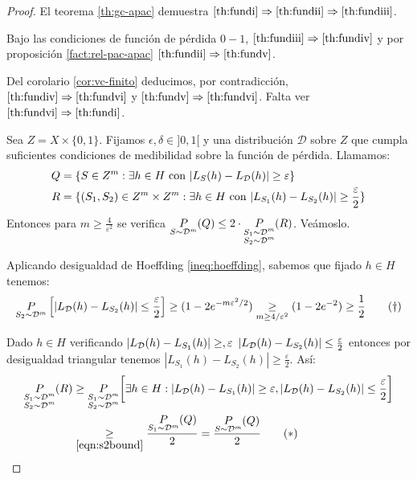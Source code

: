 \begin{proof}
 El teorema \ref{th:gc-apac} demuestra $\eqref{th:fundi} \Rightarrow \eqref{th:fundii} \Rightarrow \eqref{th:fundiii}$.
 
 Bajo las condiciones de función de pérdida $0-1$, $\eqref{th:fundiii} \Rightarrow \eqref{th:fundiv}$ y 
 por proposición \ref{fact:rel-pac-apac} $\eqref{th:fundii} \Rightarrow \eqref{th:fundv}$.
 
 Del corolario \ref{cor:vc-finito} deducimos, por contradicción, $\eqref{th:fundiv} \Rightarrow \eqref{th:fundvi}$
 y $\eqref{th:fundv} \Rightarrow \eqref{th:fundvi}$. Falta ver $\eqref{th:fundvi} \Rightarrow \eqref{th:fundi}$.
 
 Sea $Z = X \times \{0,1\}$. Fijamos $\epsilon, \delta \in ]0,1[$ y una distribución $\mathcal{D}$ sobre $Z$ que cumpla
 suficientes condiciones de medibilidad sobre la función de pérdida. Llamamos:
 \begin{align*}
  Q &= \{S \in Z^m : \exists h\in H \textrm{ con } |L_S(h) - L_{\mathcal{D}}(h)| \ge \varepsilon\}\\
  R &= \{(S_1, S_2) \in Z^m \times Z^m: \exists h\in H \textrm{ con } |L_{S_1}(h) - L_{S_2}(h)| \ge \frac{\varepsilon}{2}\}\\
 \end{align*}
 Entonces para $m\ge \frac{4}{\varepsilon^2}$ se verifica $\underset{S\sim \mathcal{D}^m}{P}(Q) \le 2 \cdot \underset{\begin{subarray}{c} S_1 \sim \mathcal{D}^{m} \\ S_2 \sim\mathcal{D}^m \end{subarray}}{P}(R)$. Veámoslo.
 
 Aplicando desigualdad de Hoeffding \ref{ineq:hoeffding}, sabemos que fijado $h\in H$ tenemos:
 \begin{equation}
  \mdosprob \left[|L_{\dist}(h) - L_{S_2}(h)| \le \frac{\varepsilon}{2} \right] \ge 
   (1 - 2e^{-m \varepsilon^2/2}) \underset{m\ge 4/\varepsilon^2}{\ge} (1 - 2e^{-2}) \ge \frac{1}{2}
  \label{eqn:s2bound}\tag{\textrm{$\dagger$}}
 \end{equation}

 Dado $h\in H$ verificando $|L_{\mathcal{D}}(h) - L_{S_1}(h)| \ge, \varepsilon$ $|L_{\mathcal{D}}(h) - L_{S_2}(h)| \le \frac{\varepsilon}{2}$
 entonces por desigualdad triangular tenemos $|L_{S_1}(h) - L_{S_2}(h)| \ge \frac{\varepsilon}{2}$. Así:
 \begin{align}
  \mmprob(R) &\ge \mmprob \bigg[ \exists h \in H: |L_{\dist}(h) - L_{S_1}(h)| 
              \ge \varepsilon, |L_{\dist}(h) - L_{S_2}(h)| \le \frac{\varepsilon}{2} \bigg] \nonumber\\
             &\underset{\eqref{eqn:s2bound}}{\ge} \frac{\munoprob(Q)}{2} = \frac{\mprob(Q)}{2}
 \label{eqn:Qbound}\tag{\textrm{$\ast$}}
 \end{align} 


\end{proof}
